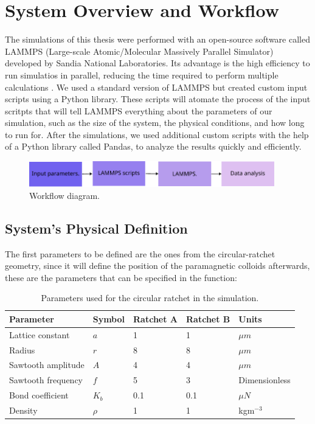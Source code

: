 
\section{System Overview and Workflow}

The simulations of this thesis were performed with an open-source software called LAMMPS (Large-scale Atomic/Molecular Massively Parallel Simulator) developed by Sandia National Laboratories. Its advantage is the high efficiency to run simulatios in parallel, reducing the time required to perform multiple calculations \cite{LAMMPS}. We used a standard version of LAMMPS but created custom input scripts using a Python library. These scripts will atomate the process of the input scritpts that will tell LAMMPS everything about the parameters of our simulation, such as the size of the system, the physical conditions, and how long to run for. After the simulations, we used additional custom scripts with the help of a Python library called Pandas, to analyze the results quickly and efficiently.

\begin{figure}[h]
  \begin{center}
    \includegraphics[width=0.95\textwidth]{figures/workflow.pdf}
  \end{center}
  \caption[Workflow diagram.]{Workflow diagram.}\label{fig:workflow}
\end{figure}

\subsection{System's Physical Definition}

The first parameters to be defined are the ones from the circular-ratchet geometry, since it will define the position of the paramagnetic colloids afterwards, these are the parameters that can be specified in the function:

\begin{table}[H]
\centering
\caption[Ratchet physical parameters.]{Parameters used for the circular ratchet in the simulation.}
\begin{tabular}{l l l l l}
\hline
Parameter & Symbol & Ratchet A & Ratchet B & Units \\
\hline
Lattice constant & \(a\) & 1 & 1 & \(\mu m\) \\
Radius & \( r\) & 8 & 8 & \( \mu m\) \\
Sawtooth amplitude & \( A\) & 4 & 4 & \( \mu m\) \\
Sawtooth frequency & \( f\) & 5 & 3 & Dimensionless\\
Bond coefficient & \( K_b\) & 0.1 & 0.1 & \( \mu N\) \\ 
Density & \(\rho\) & 1 & 1 & kgm\(^{-3}\) \\
\hline
\end{tabular}
\end{table}

